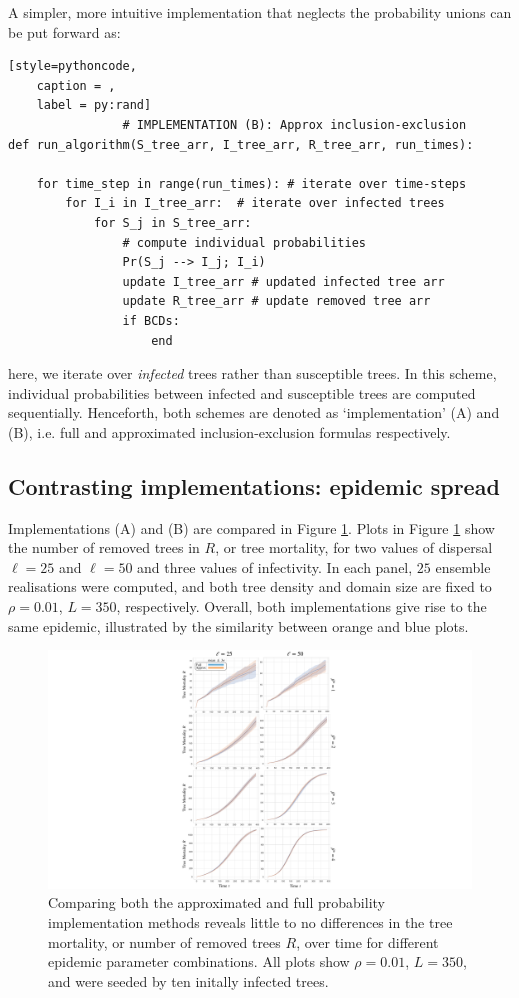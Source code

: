 A simpler, more intuitive implementation that neglects the probability unions can be put forward as:
\begin{lstlisting}[style=pythoncode,
    caption = ,
    label = py:rand]
                # IMPLEMENTATION (B): Approx inclusion-exclusion
def run_algorithm(S_tree_arr, I_tree_arr, R_tree_arr, run_times):
    
    for time_step in range(run_times): # iterate over time-steps
        for I_i in I_tree_arr:  # iterate over infected trees 
            for S_j in S_tree_arr:
                # compute individual probabilities
                Pr(S_j --> I_j; I_i) 
                update I_tree_arr # updated infected tree arr
                update R_tree_arr # update removed tree arr
                if BCDs:
                    end
\end{lstlisting}
here, we iterate over \textit{infected} trees rather than susceptible trees. 
In this scheme, individual probabilities between infected and susceptible trees are computed sequentially.
Henceforth, both schemes are denoted as `implementation' (A) and (B), i.e. full and approximated inclusion-exclusion formulas respectively.

\subsection{Contrasting implementations: epidemic spread}

Implementations (A) and (B) are compared in Figure \ref{fig:imp-comp}. 
Plots in Figure \ref{fig:imp-comp} show the number of removed trees in $R$, or tree mortality, for two values of dispersal $\ell=25$ and $\ell=50$ and three values of infectivity.
In each panel, $25$ ensemble realisations were computed, and both tree density and domain size are fixed to $\rho=0.01$, $L=350$, respectively.
Overall, both implementations give rise to the same epidemic, illustrated by the similarity between orange and blue plots.

\begin{figure}
    \centering
    \includegraphics[scale=0.60]{chapter5/figures/appendix-implementation.pdf}
    \caption{Comparing both the approximated and full probability implementation methods reveals little to no differences in the tree mortality, or number of removed trees $R$, over time for different epidemic parameter combinations. All plots show $\rho=0.01$, $L=350$, and were seeded by ten initally infected trees. }
    \label{fig:imp-comp}
\end{figure}

